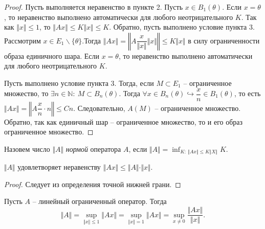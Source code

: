 \begin{proof}
Пусть выполняется неравенство в пункте 2. Пусть $\displaystyle x\in B_{1}( \theta )$. Если $\displaystyle x=\theta $, то неравенство выполнено автоматически для любого неотрицательного $\displaystyle K$. Так как $\displaystyle \Vert x\Vert \leqslant 1$, то $\displaystyle \Vert Ax\Vert \leqslant K\Vert x\Vert \leqslant K$. Обратно, пусть выполнено условие пункта 3. Рассмотрим $\displaystyle x\in E_{1} \backslash \{\theta \} .$Тогда $\displaystyle \Vert Ax\Vert =\left\Vert A\dfrac{x}{\Vert x\Vert }\Vert x\Vert \right\Vert \leqslant K\Vert x\Vert $ в силу ограниченности образа единичного шара. Если $\displaystyle x=\theta $, то неравенство выполнено автоматически для любого неотрицательного $\displaystyle K$.

Пусть выполнено условие пункта 3. Тогда, если $\displaystyle M\subset E_{1}$ -- ограниченное множество, то $\displaystyle \exists n\in \mathbb{N} :\ M\subset B_{n}( \theta )$. Тогда $\displaystyle \forall x\in B_{n}( \theta ) \hookrightarrow \dfrac{x}{n} \in B_{1}( \theta )$, то есть $\displaystyle \Vert Ax\Vert =\left\Vert A\dfrac{x}{n} \cdotp n\right\Vert \leqslant Cn$. Следовательно, $\displaystyle A( M)$ -- ограниченное множество. Обратно, так как единичный шар -- ограниченное множество, то и его образ ограниченное множество.
\end{proof}
\begin{definition}
Назовем число $\displaystyle \Vert A\Vert $ \textit{нормой} оператора $\displaystyle A$, если $\displaystyle \Vert A\Vert =\inf_{K:\ \Vert Ax\Vert \leqslant K\Vert X\Vert } K$.
\end{definition}
\begin{proposition}
$\displaystyle \Vert A\Vert $ удовлетворяет неравенству $\displaystyle \Vert Ax\Vert \leqslant \Vert A\Vert \cdotp \Vert x\Vert $.
\end{proposition}
\begin{proof}
Следует из определения точной нижней грани.
\end{proof}
\begin{proposition}
Пусть $\displaystyle A$ -- линейный ограниченный оператор. Тогда
\begin{equation*}
\Vert A\Vert =\sup _{\Vert x\Vert \leqslant 1}\Vert Ax\Vert =\sup _{\Vert x\Vert =1}\Vert Ax\Vert =\sup _{x\neq 0}\dfrac{\Vert Ax\Vert }{\Vert x\Vert } .
\end{equation*}
\end{proposition}
